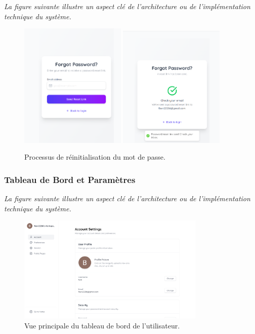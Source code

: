 \noindent
\textit{La figure suivante illustre un aspect clé de l'architecture ou de l'implémentation technique du système.}
\begin{figure}[H]
    \centering
    \includegraphics[width=0.45\textwidth]{assets/docs/web/resend-pass.png}
    \hfill
    \includegraphics[width=0.45\textwidth]{assets/docs/web/resend-succsus.png}
    \caption{Processus de réinitialisation du mot de passe.}
    \label{fig:web-reset-pass}
\end{figure}

\subsubsection{Tableau de Bord et Paramètres}
\noindent
\textit{La figure suivante illustre un aspect clé de l'architecture ou de l'implémentation technique du système.}
\begin{figure}[H]
    \centering
    \includegraphics[width=0.8\textwidth]{assets/docs/web/dashboard-page.png}
    \caption{Vue principale du tableau de bord de l'utilisateur.}
    \label{fig:web-dashboard}
\end{figure}

